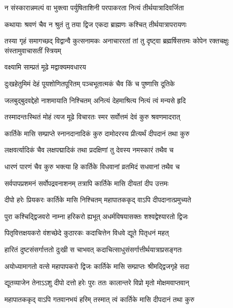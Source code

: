 \twolineshloka
{न संस्कारान्नमल्पं वा भुक्त्वा पर्युषिताशिनी}
{परपाकरता नित्यं तीर्थयात्रादिवर्जिता} %

\twolineshloka
{कथायाः श्रवणं चैव न श्रुतं तु तया द्विज}
{एकदा ब्राह्मणः कश्चित् तीर्थयात्रापरायणः} %

\threelineshloka
{तस्या गृहं समागच्छद् विद्वान्वै कुत्सनामकः}
{अनाचाररतां तां तु दृष्ट्वा ब्रह्मर्षिसत्तमः}
{कोपेन रक्तचक्षुः संस्तामुवाचासतीं स्त्रियम्} %



\onelineshloka
{वक्ष्यामि साम्प्रतं मूढे मद्वाक्यमवधारय} %

\twolineshloka
{दुःखहेतुमिमं देहं पूयशोणितपूरितम्}
{पञ्चभूतात्मकं चैव किं च पुष्णासि दूतिके} %

\twolineshloka
{जलबुद्बुदवद्देहो नाशमायाति निश्चितम्}
{अनित्यं देहमाश्रित्य नित्यं त्वं मन्यसे हृदि} %

\twolineshloka
{तस्मादन्तःस्थितं मोहं त्यज मूढे विचारतः}
{स्मर सर्वोत्तमं देवं कुरु श्रवणमादरात्} %

\twolineshloka
{कार्तिके मासि सम्प्राप्ते स्नानदानादिकं कुरु}
{दामोदरस्य प्रीत्यर्थं दीपदानं तथा कुरु} %

\twolineshloka
{लक्षवर्त्यादिकं चैव लक्षपद्मादिकं तथा}
{प्रदक्षिणां तु देवस्य नमस्कारं तथैव च} %

\twolineshloka
{धारणं पारणं चैव कुरु भक्त्या हि कार्तिके}
{विधवानां व्रतमिदं सधवानां तथैव च} %

\twolineshloka
{सर्वपापप्रशमनं सर्वोपद्रवनाशनम्}
{तत्रापि कार्तिके मासि दीयतां दीप उत्तमः} %

\twolineshloka
{दीपो हरेः प्रियकरः कार्तिके मासि निश्चितम्}
{महापातककृद् वाऽपि दीपदानात्प्रमुच्यते} %

\twolineshloka
{पुरा कश्चिद्द्विजवरो नाम्ना हरिकरो ह्यभूत्}
{अधर्मविषयासक्तः शश्वद्वेश्यारतो द्विजः} %

\twolineshloka
{पितृवित्तक्षयकरो वंशच्छेदे कुठारकः}
{कदाचित्तेन विधवे द्यूते पितृधनं महत्} %

\twolineshloka
{हारितं दुष्टसंसर्गात्ततो दुःखी स चाभवत्}
{कदाचित्साधुसंसर्गात्तीर्थयात्राप्रसङ्गतः} %

\twolineshloka
{अयोध्यामागतो वत्से महापापकरो द्विजः}
{कार्तिके मासि सम्प्राप्तः श्रीमद्द्विजगृहे सदा} %

\twolineshloka
{द्यूतव्याजेन तेनाऽऽशु दीपो दत्तो हरेः पुरः}
{ततः कालान्तरे विप्रो मृतो मोक्षमवाप्तवान्} %

\twolineshloka
{महापातककृद् वाऽपि गतवानभयं हरिम्}
{तस्मात् त्वं कार्तिके मासि दीपदानं तथा कुरु} %

